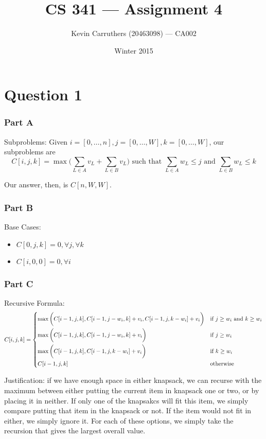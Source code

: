 \documentclass[12pt]{article}
\begin{document}
\title{CS 341 --- Assignment 4}
\author{Kevin Carruthers (20463098) --- CA002}
\date{\vspace{-2ex}Winter 2015}
\maketitle\HRule

\section*{Question 1}
\subsubsection*{Part A}
Subproblems: Given $i = [0, \dots, n], j = [0, \dots, W], k = [0, \dots, W]$, our subproblems are \[ C[i, j, k] = \max{\bigg(\sum_{L\in A}v_L + \sum_{L\in B}v_L\bigg)} \text{ such that } \sum_{L\in A}w_L \leq j \text { and } \sum_{L\in B}w_L \leq k \]

Our answer, then, is $C[n, W, W]$.

\subsubsection*{Part B}
Base Cases:
\begin{itemize}
\item $C[0, j, k] = 0, \forall j, \forall k$
\item $C[i, 0, 0] = 0, \forall i$
\end{itemize}

\subsubsection*{Part C}
Recursive Formula: \[ C[i, j, k] = \begin{dcases*}
\max{\bigg(C[i-1, j, k], C[i-1, j - w_i, k] + v_i, C[i-1, j, k - w_i] + v_i\bigg)} & if $j \geq w_i$ and $k \geq w_i$\\
\max{\bigg(C[i-1, j, k], C[i-1, j - w_i, k] + v_i\bigg)} & if $j \geq w_i$\\
\max{\bigg(C[i-1, j, k], C[i-1, j, k - w_i] + v_i\bigg)} & if $k \geq w_i$\\
C[i-1, j, k] & otherwise
\end{dcases*} \]

Justification: if we have enough space in either knapsack, we can recurse with the maximum between either putting the current item in knapsack one or two, or by placing it in neither. If only one of the knapsakcs will fit this item, we simply compare putting that item in the knapsack or not. If the item would not fit in either, we simply ignore it. For each of these options, we simply take the recursion that gives the largest overall value.
\end{document}
